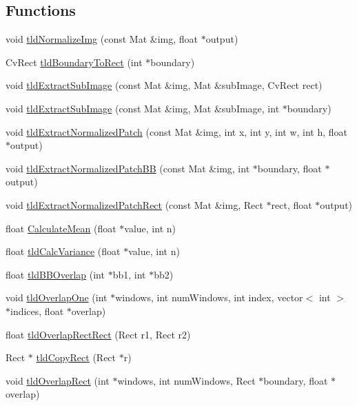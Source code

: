 \subsection*{Functions}
\begin{DoxyCompactItemize}
\item 
void \hyperlink{namespacetld_a87d078ec7492f2a2a4ef8856abaf6881}{tldNormalizeImg} (const Mat \&img, float $\ast$output)
\item 
CvRect \hyperlink{namespacetld_afd43d8a27c419d1f5da8718be917d4b5}{tldBoundaryToRect} (int $\ast$boundary)
\item 
void \hyperlink{namespacetld_a200bdf631ed45b6d0875996d2e4709f2}{tldExtractSubImage} (const Mat \&img, Mat \&subImage, CvRect rect)
\item 
void \hyperlink{namespacetld_a4af40ddc19d189513b3f34f6625eb04f}{tldExtractSubImage} (const Mat \&img, Mat \&subImage, int $\ast$boundary)
\item 
void \hyperlink{namespacetld_a1bf69e140ab91bdd7bfc794a93a1a096}{tldExtractNormalizedPatch} (const Mat \&img, int x, int y, int w, int h, float $\ast$output)
\item 
void \hyperlink{namespacetld_adf30e26ca7073712ac0eae4a1f1136ba}{tldExtractNormalizedPatchBB} (const Mat \&img, int $\ast$boundary, float $\ast$output)
\item 
void \hyperlink{namespacetld_a7bbab27cff309fae59b25b37268c22d4}{tldExtractNormalizedPatchRect} (const Mat \&img, Rect $\ast$rect, float $\ast$output)
\item 
float \hyperlink{namespacetld_a34eeb46b85efa569359847443ee96eba}{CalculateMean} (float $\ast$value, int n)
\item 
float \hyperlink{namespacetld_a53d4a014fd3df2b3e8a3026a1c1768a7}{tldCalcVariance} (float $\ast$value, int n)
\item 
float \hyperlink{namespacetld_a19776566a098d3b1fb15030e945a8c14}{tldBBOverlap} (int $\ast$bb1, int $\ast$bb2)
\item 
void \hyperlink{namespacetld_a6db9360f372b596337a075a09b715ee4}{tldOverlapOne} (int $\ast$windows, int numWindows, int index, vector$<$ int $>$ $\ast$indices, float $\ast$overlap)
\item 
float \hyperlink{namespacetld_afe4210f75b17cb13bb95c8d4c08a543a}{tldOverlapRectRect} (Rect r1, Rect r2)
\item 
Rect $\ast$ \hyperlink{namespacetld_a05ea18fc911b12873acd2211f83689f7}{tldCopyRect} (Rect $\ast$r)
\item 
void \hyperlink{namespacetld_ab71405a293095380c793589e8d59d4c7}{tldOverlapRect} (int $\ast$windows, int numWindows, Rect $\ast$boundary, float $\ast$overlap)

\end{DoxyCompactItemize}
